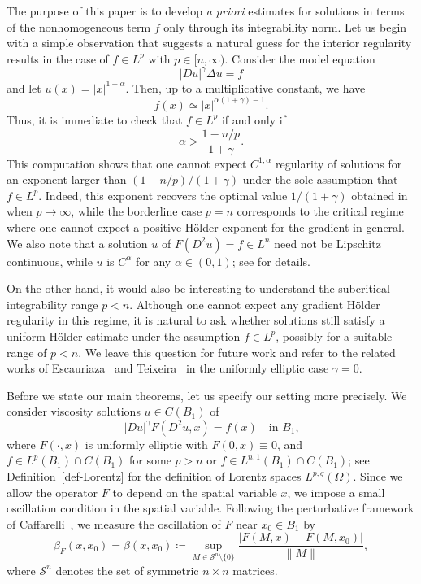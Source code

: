 \documentclass[11pt]{amsart}
\theoremstyle{plain}
\theoremstyle{definition}
\numberwithin{equation}{section}
\begin{document}
The purpose of this paper is to develop \emph{a priori} estimates for solutions in terms of the nonhomogeneous term $f$ only through its integrability norm. Let us begin with a simple observation that suggests a natural guess for the interior regularity results in the case of $f \in L^p$ with $p \in [n, \infty)$. Consider the model equation
	\begin{equation*}
	    |Du|^{\gamma} \Delta u=f
	\end{equation*}
	and let $u(x)=|x|^{1+\alpha}$. Then, up to a multiplicative constant, we have
	\begin{equation*}
	    f(x)\simeq |x|^{\alpha(1+\gamma)-1}.
	\end{equation*}
	Thus, it is immediate to check that $f\in L^p$ if and only if
    \begin{equation*}
        \alpha>\frac{1-n/p}{1+\gamma}.
    \end{equation*}
	This computation shows that one cannot expect $C^{1, \alpha}$ regularity of solutions for an exponent larger than
	$(1-n/p)/(1+\gamma)$ under the sole assumption that $f\in L^p$. Indeed, this exponent recovers the optimal value $1/(1+\gamma)$ obtained in \cite{ART15} when $p \to \infty$, while the borderline case $p=n$ corresponds to the critical regime where one cannot expect a positive H\"older exponent for the gradient in general. We also note that a solution $u$ of $F(D^2u)=f \in L^n$ need not be Lipschitz continuous, while $u$ is $C^{\alpha}$ for any $\alpha \in (0,1)$; see \cite[Remark~5]{Tei14} for details. 
    
    On the other hand, it would also be interesting to understand the subcritical integrability range
$p<n$. Although one cannot expect any gradient H\"older regularity in this regime, it is natural to ask whether solutions still satisfy a uniform H\"older
estimate under the assumption $f \in L^p$, possibly for a suitable range of $p<n$. We leave this question for future work and refer to the related works of Escauriaza~\cite{Esc93} and Teixeira~\cite{Tei14} in the uniformly elliptic case $\gamma=0$.

Before we state our main theorems, let us specify our setting more precisely. We consider viscosity solutions $u \in C(B_1)$ of  
\begin{equation*}
    |Du|^{\gamma}F(D^2u,x)=f(x) \quad \text{in $B_1$,}
\end{equation*}
where $F(\cdot, x)$ is uniformly elliptic with $F(0, x)\equiv 0$, and $f \in L^p(B_1) \cap C(B_1)$ for some $p>n$ or $f \in L^{n, 1}(B_1) \cap C(B_1)$; see Definition~\ref{def-Lorentz} for the definition of Lorentz spaces $L^{p,q}(\Omega)$. Since we allow the operator $F$ to depend on the spatial variable $x$, we impose a small oscillation condition in the spatial variable. Following the perturbative framework of Caffarelli~\cite{Caf89}, we measure the oscillation of $F$ near $x_0 \in B_1$ by
\begin{equation}\label{eq-def-beta}
    \beta_F(x, x_0)=\beta(x, x_0) \coloneqq \sup_{M \in \mathcal{S}^n \setminus \{0\}} \frac{|F(M, x)-F(M, x_0)|}{\|M\|},
\end{equation}
where $\mathcal{S}^n$ denotes the set of symmetric $n \times n$ matrices.
\end{document}
